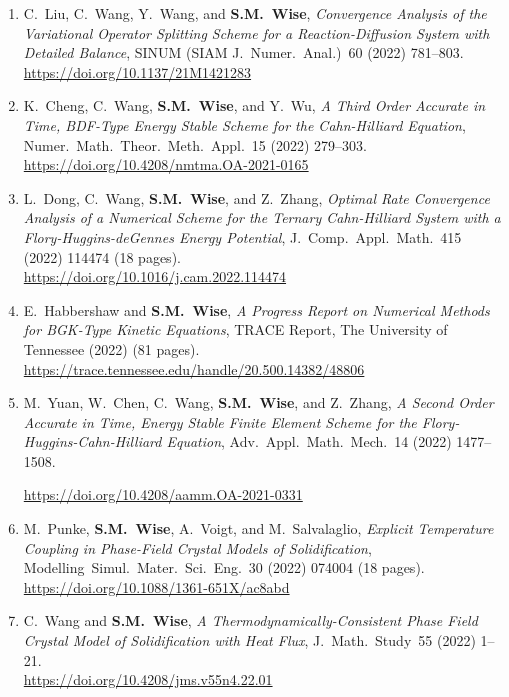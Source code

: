 \documentclass[10pt,letterpaper]{article}
\begin{document}
\begin{enumerate}
	\item
C.~Liu, C.~Wang, Y.~Wang, and \textbf{S.M.~Wise}, {\sl Convergence Analysis of the Variational Operator Splitting Scheme for a Reaction-Diffusion System with Detailed Balance}, SINUM (SIAM J.~Numer.~Anal.)~60 (2022) 781--803.
	\\
\url{https://doi.org/10.1137/21M1421283}

	\item
K.~Cheng, C.~Wang, \textbf{S.M.~Wise}, and Y.~Wu, {\sl A Third Order Accurate in Time, BDF-Type Energy Stable Scheme for the Cahn-Hilliard Equation}, Numer.~Math.~Theor.~Meth.~Appl.~15 (2022) 279--303.
	\\
\url{https://doi.org/10.4208/nmtma.OA-2021-0165}

	\item
L.~Dong, C.~Wang, \textbf{S.M.~Wise}, and Z.~Zhang, {\sl Optimal Rate Convergence Analysis of a Numerical Scheme for the Ternary Cahn-Hilliard System with a Flory-Huggins-deGennes Energy Potential}, J.~Comp.~Appl.~Math.~415 (2022) 114474 (18 pages).
	\\
\url{https://doi.org/10.1016/j.cam.2022.114474}

	\item
E.~Habbershaw and \textbf{S.M.~Wise}, {\sl A Progress Report on Numerical Methods for BGK-Type Kinetic Equations}, TRACE Report, The University of Tennessee (2022) (81 pages).
 	\\
\url{https://trace.tennessee.edu/handle/20.500.14382/48806}

	\item
M.~Yuan, W.~Chen, C.~Wang, \textbf{S.M.~Wise}, and Z.~Zhang, {\sl A Second Order Accurate in Time, Energy Stable Finite Element Scheme for the Flory-Huggins-Cahn-Hilliard Equation}, Adv.~Appl.~Math.~Mech.~14 (2022) 1477--1508.

\url{https://doi.org/10.4208/aamm.OA-2021-0331}

	\item
M.~Punke, \textbf{S.M.~Wise}, A.~Voigt, and M.~Salvalaglio, {\sl  Explicit Temperature Coupling in Phase-Field Crystal Models of Solidification}, Modelling~Simul.~Mater.~Sci.~Eng.~30 (2022) 074004 (18 pages).
	\\ 
\url{https://doi.org/10.1088/1361-651X/ac8abd}

	\item
C.~Wang  and \textbf{S.M.~Wise}, {\sl A Thermodynamically-Consistent Phase Field Crystal Model of Solidification with Heat Flux}, J.~Math.~Study~55 (2022) 1--21.
	\\
\url{https://doi.org/10.4208/jms.v55n4.22.01}


\end{enumerate}
\end{document}
